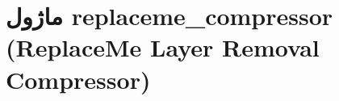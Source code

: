 \section{ماژول replaceme\_compressor (ReplaceMe Layer Removal Compressor)}
\label{sec:module_replaceme_compressor}

